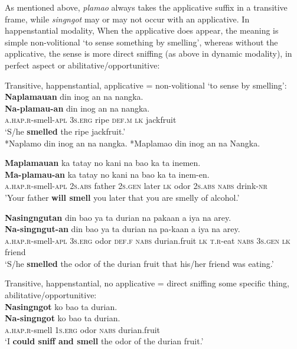 As mentioned above, \textit{plamao} always takes the applicative suffix in a transitive frame, while \textit{singngot} may or may not occur with an applicative. In happenstantial modality, When the applicative does appear, the meaning is simple non-volitional ‘to sense something by smelling’, whereas without the applicative, the sense is more direct sniffing (as above in dynamic modality), in perfect aspect or abilitative/opportunitive:

\ea
Transitive, happenstantial, applicative = non-volitional ‘to sense by smelling’: \\
\textbf{Naplamauan}  din  inog  an  na  nangka. \\\smallskip
\gll \textbf{Na-plamau-an}  din  inog  an  na  nangka. \\
\textsc{a.hap.r}-smell-\textsc{apl}  3\textsc{s.erg}  ripe  \textsc{def.m}  \textsc{lk}  jackfruit \\
\glt ‘S/he \textbf{smelled} the ripe jackfruit.’ \\\smallskip
*Naplamo din inog an na nangka.  *Maplamao din inog an na Nangka.
\z

\ea
\textbf{Maplamauan}  ka  tatay  no  kani  na  bao  ka  ta  inemen. \\\smallskip
\gll \textbf{Ma-plamau-an}  ka  tatay  no  kani  na  bao  ka  ta  inem-en. \\
\textsc{a.hap.r}-smell-\textsc{apl}  2\textsc{s.abs}  father  2\textsc{s.gen}  later  \textsc{lk}  odor  2\textsc{s.abs}  \textsc{nabs}  drink-\textsc{nr} \\
\glt ’Your father \textbf{will smell} you later that you are smelly of alcohol.’
\z

\newpage
\ea
\textbf{Nasingngutan}  din  bao  ya  ta  durian  na  pakaan a  iya  na  arey. \\\smallskip
\gll \textbf{Na-singngut-an}  din  bao  ya  ta  durian  na  pa-kaan a  iya  na  arey. \\
\textsc{a.hap.r}-smell-\textsc{apl}  3\textsc{s.erg}  odor  \textsc{def.f}  \textsc{nabs}  durian.fruit  \textsc{lk}  \textsc{t.r}-eat \textsc{nabs}   3\textsc{s.gen}  \textsc{lk}  friend \\
\glt ‘S/he \textbf{smelled} the odor of the durian fruit that his/her friend was eating.’
\z

\ea
Transitive, happenstantial, no applicative = direct sniffing some specific thing, abilitative/opportunitive: \\
\textbf{Nasingngot}  ko  bao  ta  durian. \\\smallskip
\gll \textbf{Na-singngot}  ko  bao  ta  durian. \\
\textsc{a.hap.r}-smell  1\textsc{s.erg}  odor  \textsc{nabs}  durian.fruit \\
\glt ‘I \textbf{could sniff and smell} the odor of the durian fruit.'
\z

